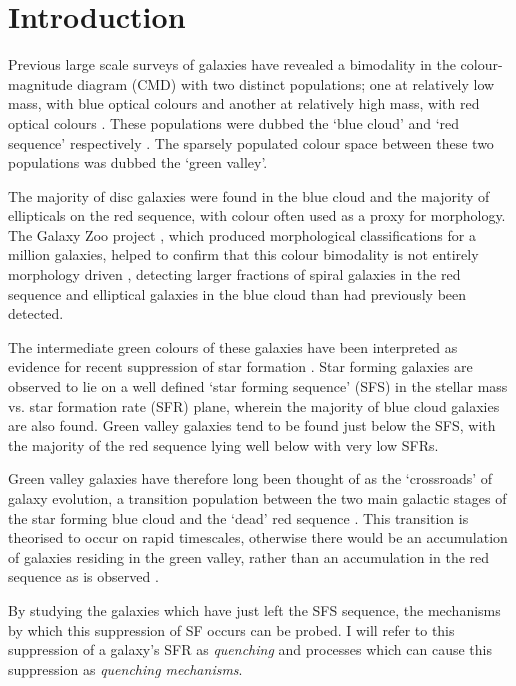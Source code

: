  \chapter{Introduction}\label{chap:intro}

Previous large scale surveys of galaxies have revealed a bimodality in the colour-magnitude diagram (CMD) with two distinct populations; one at relatively low mass, with blue optical colours and another at relatively high mass, with red optical colours \citep{Baldry04, Baldry06, Willmer06, ball08, Brammer09}. These populations were dubbed the `blue cloud' and `red sequence' respectively \citep{Chester64, bower92, Driver06, Faber07}.  The sparsely populated colour space between these two populations was dubbed the  `green valley'.

The majority of disc galaxies were found in the blue cloud and  the majority of ellipticals on the red sequence, with colour often used as a proxy for morphology. The Galaxy Zoo project \citep{Lintott11}, which produced morphological classifications for a million galaxies, helped to confirm that this colour bimodality is not entirely morphology driven \citep{Strat01, Salim07, Sch07, CHV08, Bamford09, Skibba09}, detecting larger fractions of spiral galaxies in the red sequence \citep{masters10c} and elliptical galaxies in the blue cloud \citep{Sch09} than had previously been detected.

The intermediate green colours of these galaxies have been interpreted as evidence for recent suppression of star formation \citep{Salim07}. Star forming galaxies are observed to lie on a well defined `star forming sequence' (SFS) in the stellar mass vs. star formation rate (SFR) plane, wherein the majority of blue cloud galaxies are also found. Green valley galaxies tend to be found just below the SFS, with the majority of the red sequence lying well below with very low SFRs. 

Green valley galaxies have therefore long been thought of as the `crossroads' of galaxy evolution, a transition population between the two main galactic stages of the star forming blue cloud and the `dead' red sequence \citep{Bell04, Wyder07, Schim07, Martin07, Faber07, Mendez11, Gonc12, schawinski14, Pan14}. This transition is theorised to occur on rapid timescales, otherwise there would be an accumulation of galaxies residing in the green valley, rather than an accumulation in the red sequence as is observed \citep{Arnouts07, Martin07}.

By studying the galaxies which  have just left the SFS sequence, the mechanisms by which this suppression of SF occurs can be probed. I will refer to this suppression of a galaxy's SFR as \emph{quenching} and processes which can cause this suppression as \emph{quenching mechanisms}.  

